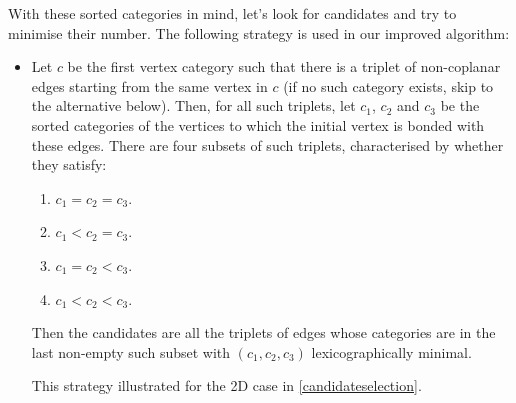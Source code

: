 \documentclass[main.tex]{subfiles}
\begin{document}
With these sorted categories in mind, let's look for candidates and try to minimise their number. The following strategy is used in our improved algorithm:
\begin{itemize}[noitemsep]
	\item Let $c$ be the first vertex category such that there is a triplet of non-coplanar edges starting from the same vertex in $c$ (if no such category exists, skip to the alternative below). Then, for all such triplets, let $c_1$, $c_2$ and $c_3$ be the sorted categories of the vertices to which the initial vertex is bonded with these edges. There are four subsets of such triplets, characterised by whether they satisfy:
	\begin{enumerate}[noitemsep]
		\item $c_1 = c_2 = c_3$.
		\item $c_1 < c_2 = c_3$.
		\item $c_1 = c_2 < c_3$.
		\item $c_1 < c_2 < c_3$.
	\end{enumerate}
	Then the candidates are all the triplets of edges whose categories are in the last non-empty such subset with $(c_1,c_2,c_3)$ lexicographically minimal.
	
	This strategy illustrated for the 2D case in \autoref{candidateselection}.
	

\end{itemize}
\end{document}
